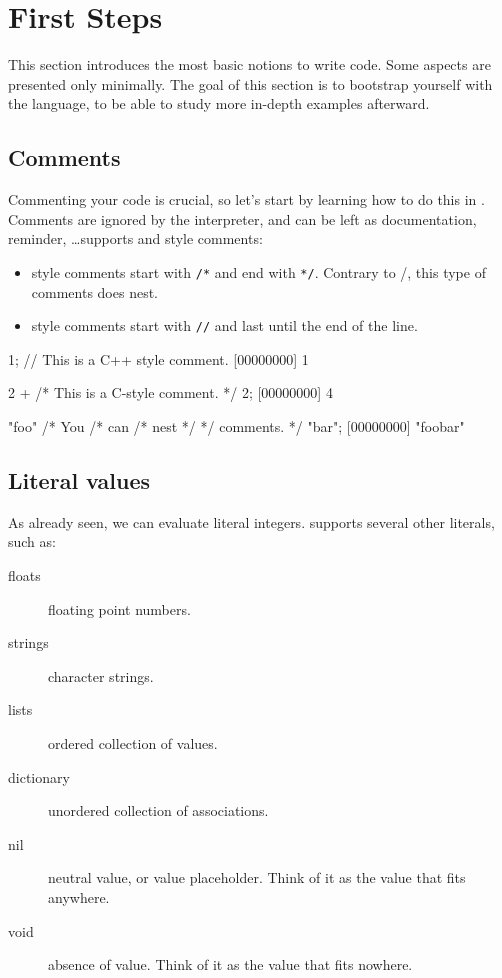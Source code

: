 
\chapter{First Steps}
\label{sec:tut:first}
This section introduces the most basic notions to write \us code. Some
aspects are presented only minimally.  The goal of this section is to
bootstrap yourself with the \us language, to be able to study more
in-depth examples afterward.

\section{Comments}

Commenting your code is crucial, so let's start by learning how to do this
in \us. Comments are ignored by the interpreter, and can be left as
documentation, reminder, \ldots \us supports \langC and \Cxx style comments:

\begin{itemize}
\item \langC style comments start with \texttt{/*} and end with \texttt{*/}.
  Contrary to \langC/\Cxx, this type of comments does nest.
\item \Cxx style comments start with \texttt{//} and last until the
  end of the line.
\end{itemize}

\begin{urbiscript}[firstnumber=1]
1; // This is a C++ style comment.
[00000000] 1

2 + /* This is a C-style comment. */ 2;
[00000000] 4

"foo" /* You /* can /* nest */ */ comments. */ "bar";
[00000000] "foobar"
\end{urbiscript}


\section{Literal values}

As already seen, we can evaluate literal integers. \us supports
several other literals, such as:

\begin{description}
\item[floats] floating point numbers.
\item[strings] character strings.
\item[lists] ordered collection of values.
\item[dictionary] unordered collection of associations.
\item[nil] neutral value, or value placeholder. Think of it as the value
  that fits anywhere.
\item[void] absence of value. Think of it as the value that fits nowhere.
\end{description}

